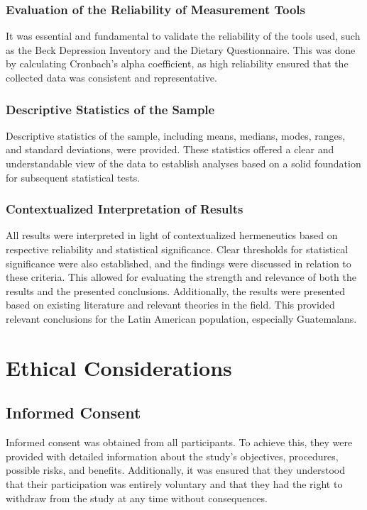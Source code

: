 \documentclass[jou]{apa7}
\begin{document}
\subsubsection{Evaluation of the Reliability of Measurement Tools}
It was essential and fundamental to validate the reliability of the tools used, such as the Beck Depression Inventory and the Dietary Questionnaire. This was done by calculating Cronbach's alpha coefficient, as high reliability ensured that the collected data was consistent and representative.

\subsubsection{Descriptive Statistics of the Sample}
Descriptive statistics of the sample, including means, medians, modes, ranges, and standard deviations, were provided. These statistics offered a clear and understandable view of the data to establish analyses based on a solid foundation for subsequent statistical tests.

\subsubsection{Contextualized Interpretation of Results}
All results were interpreted in light of contextualized hermeneutics based on respective reliability and statistical significance. Clear thresholds for statistical significance were also established, and the findings were discussed in relation to these criteria. This allowed for evaluating the strength and relevance of both the results and the presented conclusions. Additionally, the results were presented based on existing literature and relevant theories in the field. This provided relevant conclusions for the Latin American population, especially Guatemalans.


\section{Ethical Considerations}\label{consideraciones-uxe9ticas}

\subsection{Informed Consent}\label{consentimiento-informado}

Informed consent was obtained from all participants. To achieve this, they were provided with detailed information about the study's objectives, procedures, possible risks, and benefits. Additionally, it was ensured that they understood that their participation was entirely voluntary and that they had the right to withdraw from the study at any time without consequences.
\end{document}
